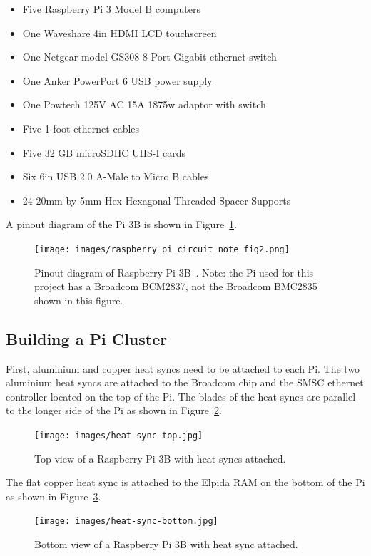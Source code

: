 \begin{itemize}
\item Five Raspberry Pi 3 Model B computers 
\item One Waveshare 4in HDMI LCD touchscreen
\item One Netgear model GS308 8-Port Gigabit ethernet switch
\item One Anker PowerPort 6 USB power supply
\item One Powtech 125V AC 15A 1875w adaptor with switch
\item Five 1-foot ethernet cables
\item Five 32 GB microSDHC UHS-I cards
\item Six 6in USB 2.0 A-Male to Micro B cables
\item 24 20mm by 5mm Hex Hexagonal Threaded Spacer Supports
\end{itemize}

A pinout diagram of the Pi 3B is shown in Figure~\ref{f:pinout-diagram}.

\begin{figure}[!ht]
  \centering\texttt{[image: images/raspberry\_pi\_circuit\_note\_fig2.png]} \caption{Pinout
  diagram of Raspberry Pi 3B~\cite{hid-sp18-419-pi-pinout}. Note: the
  Pi used for this project has a Broadcom BCM2837, not the Broadcom
  BMC2835 shown in this figure.}\label{f:pinout-diagram}
\end{figure}

\subsection{Building a Pi Cluster}
First, aluminium and copper heat syncs need to be attached to each
Pi. The two aluminium heat syncs are attached to the Broadcom chip and
the SMSC ethernet controller located on the top of the Pi. The blades
of the heat syncs are parallel to the longer side of the Pi as shown
in Figure~\ref{f:heat-sync-top}.

\begin{figure}[!ht]
  \centering\texttt{[image: images/heat-sync-top.jpg]} \caption{Top
  view of a Raspberry Pi 3B with heat syncs
  attached.}\label{f:heat-sync-top}
\end{figure}

The flat copper heat sync is attached to the Elpida RAM on the bottom
of the Pi as shown in Figure~\ref{f:heat-sync-bottom}.

\begin{figure}[!ht]
  \centering\texttt{[image: images/heat-sync-bottom.jpg]} \caption{Bottom
  view of a Raspberry Pi 3B with heat sync
  attached.}\label{f:heat-sync-bottom}
\end{figure}

